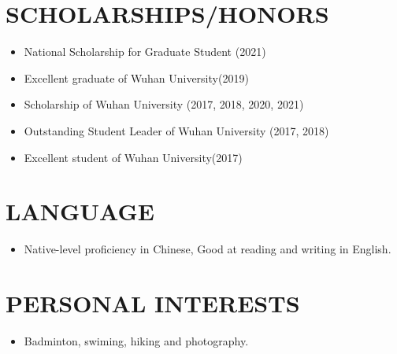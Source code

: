 \documentclass[a4paper,12pt]{article}
\begin{document}
\section{SCHOLARSHIPS/HONORS}
\begin{itemize}[noitemsep,nolistsep,leftmargin=*]
	\item {National Scholarship for Graduate Student (2021)}
	\item {Excellent graduate of Wuhan University(2019)}
	\item {Scholarship of Wuhan University (2017, 2018, 2020, 2021)}
	\item {Outstanding Student Leader of Wuhan University (2017, 2018)}
	\item {Excellent student of Wuhan University(2017)}
\end{itemize}

\section{LANGUAGE}
\begin{itemize}[noitemsep,nolistsep,leftmargin=*]
	\item {Native-level proficiency in Chinese, Good at reading and writing in English. }
\end{itemize}

\section{PERSONAL INTERESTS}
\begin{itemize}[noitemsep,nolistsep,leftmargin=*]
	\item {Badminton, swiming, hiking and photography.}
\end{itemize}

\vfill
{}
\end{document}

